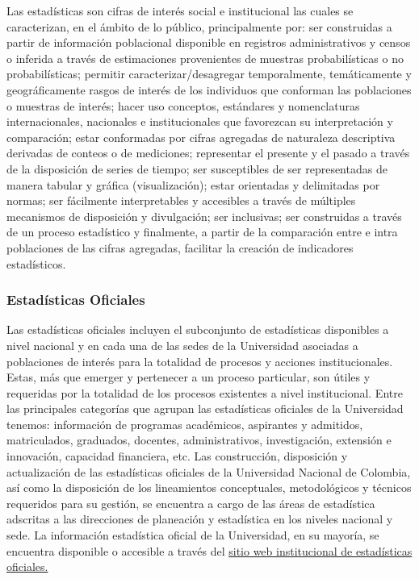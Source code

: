 \documentclass[
]{book}
\begin{document}
Las estadísticas son cifras de interés social e institucional las cuales se caracterizan, en el ámbito de lo público, principalmente por: ser construidas a partir de información poblacional disponible en registros administrativos y censos o inferida a través de estimaciones provenientes de muestras probabilísticas o no probabilísticas; permitir caracterizar/desagregar temporalmente, temáticamente y geográficamente rasgos de interés de los individuos que conforman las poblaciones o muestras de interés; hacer uso conceptos, estándares y nomenclaturas internacionales, nacionales e institucionales que favorezcan su interpretación y comparación; estar conformadas por cifras agregadas de naturaleza descriptiva derivadas de conteos o de mediciones; representar el presente y el pasado a través de la disposición de series de tiempo; ser susceptibles de ser representadas de manera tabular y gráfica (visualización); estar orientadas y delimitadas por normas; ser fácilmente interpretables y accesibles a través de múltiples mecanismos de disposición y divulgación; ser inclusivas; ser construidas a través de un proceso estadístico y finalmente, a partir de la comparación entre e intra poblaciones de las cifras agregadas, facilitar la creación de indicadores estadísticos.

\hypertarget{estaduxedsticas-oficiales}{%
\subsubsection{Estadísticas Oficiales}\label{estaduxedsticas-oficiales}}

Las estadísticas oficiales incluyen el subconjunto de estadísticas disponibles a nivel nacional y en cada una de las sedes de la Universidad asociadas a poblaciones de interés para la totalidad de procesos y acciones institucionales. Estas, más que emerger y pertenecer a un proceso particular, son útiles y requeridas por la totalidad de los procesos existentes a nivel institucional. Entre las principales categorías que agrupan las estadísticas oficiales de la Universidad tenemos: información de programas académicos, aspirantes y admitidos, matriculados, graduados, docentes, administrativos, investigación, extensión e innovación, capacidad financiera, etc. Las construcción, disposición y actualización de las estadísticas oficiales de la Universidad Nacional de Colombia, así como la disposición de los lineamientos conceptuales, metodológicos y técnicos requeridos para su gestión, se encuentra a cargo de las áreas de estadística adscritas a las direcciones de planeación y estadística en los niveles nacional y sede. La información estadística oficial de la Universidad, en su mayoría, se encuentra disponible o accesible a través del \href{http://estadisticas.unal.edu.co/home/}{sitio web institucional de estadísticas oficiales.}
\end{document}

